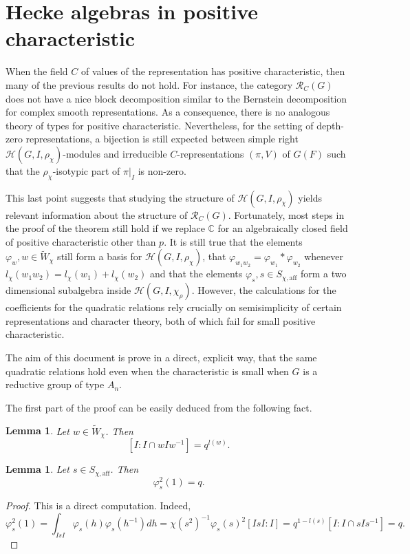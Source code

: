 \documentclass{article}
\newcommand{\aff}{\mathrm{aff}}
\newcommand{\calpha}{\check{\alpha}}
\newcommand{\cR}{\mathcal{R}}
\newcommand{\cH}{\mathcal{H}}
\newcommand{\CC}{\mathbb{C}}
\theoremstyle{plain}
\newtheorem{lemma}[theorem]{Lemma}
\theoremstyle{definition}
\begin{document}
    \section{Hecke algebras in positive characteristic}
    
    When the field $C$ of values of the representation has positive characteristic, then many of the previous results do not hold. For instance, the category $\cR_C(G)$ does not have a nice block decomposition similar to the Bernstein decomposition for complex smooth representations. As a consequence, there is no analogous theory of types for positive characteristic. Nevertheless, for the setting of depth-zero representations, a bijection is still expected between simple right $\cH(G,I,\rho_\chi)$-modules and irreducible $C$-representations $(\pi,V)$ of $G(F)$ such that the $\rho_\chi$-isotypic part of $\pi|_I$ is non-zero. 

    This last point suggests that studying the structure of $\cH(G,I,\rho_\chi)$ yields relevant information about the structure of $\cR_C(G)$. Fortunately, most steps in the proof of the theorem still hold if we replace $\CC$ for an algebraically closed field of positive characteristic other than $p$. It is still true that the elements $\varphi_w, w\in\tilde{W}_\chi$ still form a basis for $\cH(G,I,\rho_\chi)$, that $\varphi_{w_1w_2}=\varphi_{w_1}*\varphi_{w_2}$ whenever $l_\chi(w_1w_2)=l_\chi(w_1)+l_\chi(w_2)$ and that the elements $\varphi_s, s\in S_{\chi,\aff}$ form a two dimensional subalgebra inside $\cH(G,I,\chi_\rho)$. However, the calculations for the coefficients for the quadratic relations rely crucially on semisimplicity of certain representations and character theory, both of which fail for small positive characteristic. 

    The aim of this document is prove in a direct, explicit way, that the same quadratic relations hold even when the characteristic is small when $G$ is a reductive group of type $A_n$.

    The first part of the proof can be easily deduced from the following fact.

    \begin{lemma}
        Let $w\in\tilde{W}_\chi$. Then
        $$[I:I\cap wIw^{-1}]=q^{l(w)}.$$
    \end{lemma}

    \begin{lemma}
        Let $s\in S_{\chi,\aff}$. Then
        $$\varphi_s^2(1)=q.$$
    \end{lemma}
    \begin{proof}
        This is a direct computation. Indeed,
        \begin{equation*}
            \varphi_s^2(1)=\int_{IsI}\varphi_s(h)\varphi_s(h^{-1})dh=\chi(s^2)^{-1}\varphi_s(s)^2[IsI:I]=q^{1-l(s)}[I:I\cap sIs^{-1}]=q.
        \end{equation*}
    \end{proof}
\end{document}
